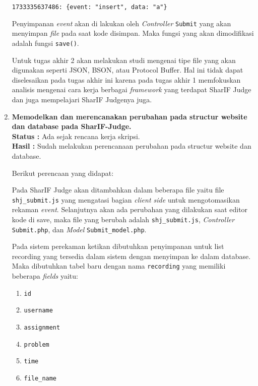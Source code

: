 \documentclass[a4paper,twoside]{article}
\begin{document}
\begin{enumerate}
	      \begin{center}
		      \verb|1733335637486: {event: "insert", data: "a"}|
	      \end{center}

	      Penyimpanan \textit{event} akan di lakukan oleh \textit{Controller} \verb|Submit| yang akan menyimpan \textit{file} pada saat kode disimpan. Maka fungsi yang akan dimodifikasi adalah fungsi \verb|save()|.

	      Untuk tugas akhir 2 akan melakukan studi mengenai tipe file yang akan digunakan seperti JSON, BSON, atau Protocol Buffer. Hal ini tidak dapat diselesaikan pada tugas akhir ini karena pada tugas akhir 1 memfokuskan analisis mengenai cara kerja berbagai \textit{framework} yang terdapat SharIF Judge dan juga mempelajari SharIF Judgenya juga.

	\item \textbf{Memodelkan dan merencanakan perubahan pada structur website dan database pada SharIF-Judge.} \\
	      {\bf Status :} Ada sejak rencana kerja skripsi.\\
	      {\bf Hasil :} Sudah melakukan perencanaan perubahan pada structur website dan database.

	      Berikut perencaan yang didapat:

	      Pada SharIF Judge akan ditambahkan dalam beberapa file yaitu file \verb|shj_submit.js| yang mengatasi bagian \textit{client side} untuk mengotomasikan rekaman \textit{event}. Selanjutnya akan ada perubahan yang dilakukan saat editor kode di save, maka file yang berubah adalah \verb|shj_submit.js|, \textit{Controller} \verb|Submit.php|, dan \textit{Model} \verb|Submit_model.php|.

	      Pada sistem perekaman ketikan dibutuhkan penyimpanan untuk list recording yang tersedia dalam sistem dengan menyimpan ke dalam database. Maka dibutuhkan tabel baru dengan nama \verb|recording| yang memiliki beberapa \textit{fields} yaitu:

	      \begin{enumerate}
		      \item \verb|id|
		      \item \verb|username|
		      \item \verb|assignment|
		      \item \verb|problem|
		      \item \verb|time|
		      \item \verb|file_name|
	      \end{enumerate}


\end{enumerate}
\end{document}

